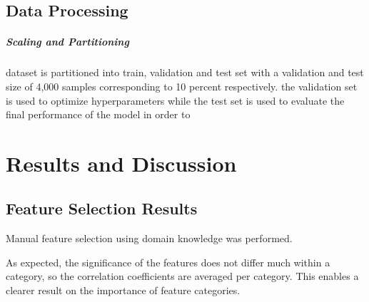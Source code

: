 \documentclass[12pt, a4paper, headinclude, twoside, plainheadsepline, open=right, numbers=noenddot, hidelinks, toc=listof, toc=bibliography]{scrreprt}
\begin{document}
\section{Data Processing}
\label{sec:data_processing}


\paragraph{Scaling and Partitioning}
dataset is partitioned into train, validation and test set with a validation and test size of 4,000 samples corresponding to 10 percent respectively.
the validation set is used to optimize hyperparameters while the test set is used to evaluate the final performance of the model
in order to 



\chapter{Results and Discussion}
\label{chap:results}

\section{Feature Selection Results}
\label{sec:feature_selection_results}
Manual feature selection using domain knowledge was performed.

As expected, the significance of the features does not differ much within a category, so the correlation coefficients are averaged per category.
This enables a clearer result on the importance of feature categories.
\end{document}
